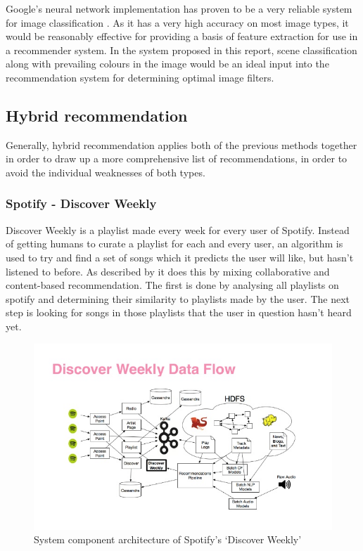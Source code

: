 \documentclass[a4paper,12pt]{report}
\begin{document}
        Google's neural network implementation has proven to be a very reliable system for image classification \citep{krizhevsky2012imagenet}.
        As it has a very high accuracy on most image types, it would be reasonably effective for providing a basis of feature extraction for use in a recommender system. In the system proposed in this report, scene classification along with prevailing colours in the image would be an ideal input into the recommendation system for determining optimal image filters.

    \subsection{Hybrid recommendation}
      Generally, hybrid recommendation applies both of the previous methods together in order to draw up a more comprehensive list of recommendations, in order to avoid the individual weaknesses of both types.

      \subsubsection{Spotify - Discover Weekly}
      \label{discoverweekly}
        Discover Weekly is a playlist made every week for every user of Spotify. Instead of getting humans to curate a playlist for each and every user, an algorithm is used to try and find a set of songs which it predicts the user will like, but hasn't listened to before. As described by \cite{popper2015dw} it does this by mixing collaborative and content-based recommendation. The first is done by analysing all playlists on spotify and determining their similarity to playlists made by the user. The next step is looking for songs in those playlists that the user in question hasn't heard yet.

        \begin{figure}[ht]
          \centering
          \includegraphics[width=\linewidth]{discoverweekly-dataflow}
          \caption[System component architecture of Spotify's ‘Discover Weekly’]{System component architecture of Spotify's ‘Discover Weekly’ \protect\citep{johnson2015dw}}
          \label{fig:discoverweekly-dataflow}
        \end{figure}
\end{document}
